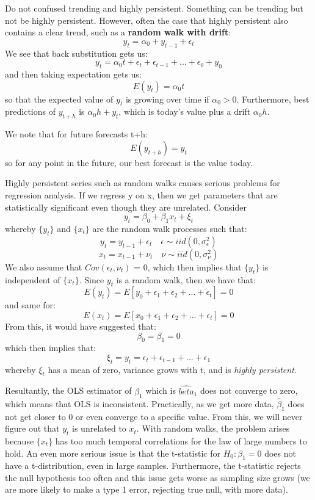\documentclass[11pt, oneside]{article}
\theoremstyle{definition}
\begin{document}
Do not confused trending and highly persistent. Something can be trending but not be highly persistent. However, often the case that highly persistent also contains a clear trend, such as a \textbf{random walk with drift}:
$$
y_t = \alpha_0 + y_{t-1} + \epsilon_t
$$
We see that back substitution gets us:
$$
y_t = \alpha_0t + \epsilon_t + \epsilon_{t-1} + ... + \epsilon_{0} + y_0
$$
and then taking expectation gets us:
$$
E(y_t) = \alpha_0t
$$
so that the expected value of $y_t$ is growing over time if $\alpha_0 > 0$. Furthermore, best predictions of $y_{t+h}$ is $\alpha_0h + y_t$, which is today's value plus a drift $\alpha_0h$.

We note that for future forecasts t+h:
$$
E(y_{t+h}) = y_t
$$
so for any point in the future, our best forecast is the value today.

Highly persistent series such as random walks causes serious problems for regression analysis. If we regress y on x, then we get parameters that are statistically significant even though they are unrelated. Consider
$$
y_t = \beta_0 + \beta_1x_t + \xi_t
$$
whereby $\{y_t\}$ and $\{x_t\}$ are the random walk processes such that:
$$
y_t = y_{t-1} + \epsilon_t \quad \epsilon \sim iid(0,\sigma_{\epsilon}^2)
$$
$$
x_t = x_{t-1} + \nu_t \quad \nu \sim iid(0,\sigma_{\nu}^2)
$$
We also assume that $Cov(\epsilon_t,\nu_t)$ = 0, which then implies that $\{y_t\}$ is independent of $\{x_t\}$. Since $y_t$ is a random walk, then we have that:
$$
E(y_t) = E[y_0 + \epsilon_1 + \epsilon_2 +...+ \epsilon_t] = 0
$$
and same for:
$$
E(x_t) = E[x_0 + \epsilon_1 + \epsilon_2 +...+ \epsilon_t] = 0
$$
From this, it would have suggested that:
$$
\beta_0 = \beta_1 = 0
$$
which then implies that:
$$
\xi_t = y_t = \epsilon_t + \epsilon_{t-1} + ... + \epsilon_1
$$
whereby $\xi_t$ has a mean of zero, variance grows with t, and is \textit{highly persistent}.

Resultantly, the OLS estimator of $\beta_1$ which is  $\hat{beta}_1$ does not converge to zero, which means that OLS is inconsistent. Practically, as we get more data, $\hat{\beta}_1$ does not get closer to 0 or even converge to a specific value. From this, we will never figure out that $y_t$ is unrelated to $x_t$. With random walks, the problem arises because $\{x_t\}$ has too much temporal correlations for the law of large numbers to hold. An even more serious issue is that the t-statistic for $H_0: \beta_1 = 0$ does not have a t-distribution, even in large samples. Furthermore, the t-statistic rejects the null hypothesis too often and this issue gets worse as sampling size grows (we are more likely to make a type 1 error, rejecting true null, with more data).
\end{document}
